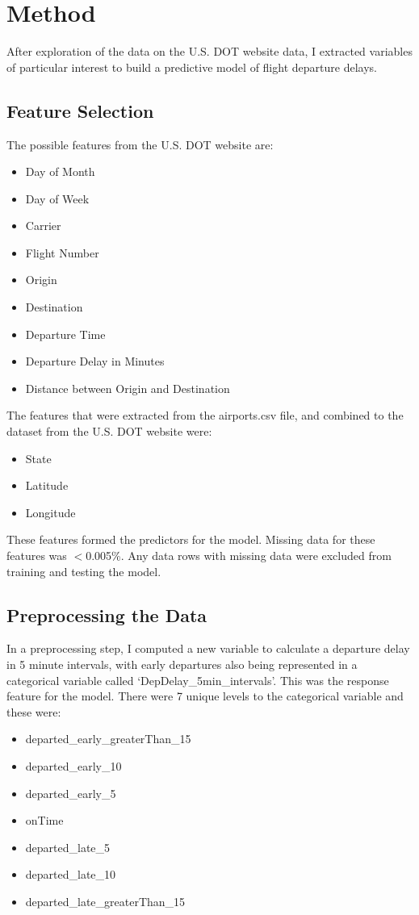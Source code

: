\documentclass[a4paper, 10pt]{article}
\begin{document}
\section{Method}
After exploration of the data on the U.S. DOT website data, I extracted variables of particular interest to build a predictive model of flight departure delays.



\subsection{Feature Selection}
The possible features from the U.S. DOT website are:
\begin{itemize}
\item{Day of Month}
\item{Day of Week}
\item{Carrier}
\item{Flight Number}
\item{Origin}
\item{Destination}
\item{Departure Time}
\item{Departure Delay in Minutes}
\item{Distance between Origin and Destination}
\end{itemize}

The features that were extracted from the airports.csv file, and combined to the dataset from the U.S. DOT website were:
\begin{itemize}
\item{State}
\item{Latitude}
\item{Longitude}
\end{itemize}

\vspace{5mm}
These features formed the predictors for the model. Missing data for these features was $<$0.005\%. Any data rows with missing data were excluded from training and testing the model. 

\subsection{Preprocessing the Data}
In a preprocessing step, I computed a new variable to calculate a departure delay in 5 minute intervals, with early departures also being represented in a categorical variable called `DepDelay\_5min\_intervals'. This was the response feature for the model. There were 7 unique levels to the categorical variable and these were:
\begin{itemize}
\item{departed\_early\_greaterThan\_15}
\item{departed\_early\_10}
\item{departed\_early\_5}
\item{onTime}
\item{departed\_late\_5}
\item{departed\_late\_10}
\item{departed\_late\_greaterThan\_15}
\end{itemize}
\end{document}
